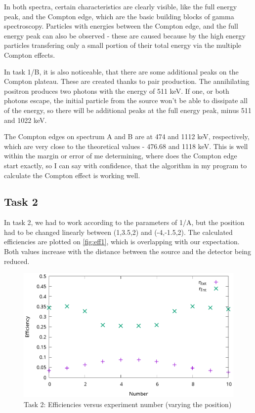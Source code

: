 \documentclass[a4paper,12pt]{article}
\begin{document}
In both spectra, certain characteristics are clearly visible, like the full energy peak, and the Compton edge, which are the basic building blocks of gamma spectroscopy. Particles with  energies between the Compton edge, and the full energy peak can also be observed - these are caused because by the high energy particles transfering only a small portion of their total energy via the multiple Compton effects.

In task 1/B, it is also noticeable, that there are some additional peaks on the Compton plateau. These are created thanks to pair production. The annihilating positron produces two photons with the energy of 511 keV. If one, or both photons escape, the initial particle from the source won't be able to dissipate all of the energy, so there will be additional peaks at the full energy peak, minus 511 and 1022 keV.

The Compton edges on spectrum A and B are at 474 and 1112 keV, respectively, which are very close to the theoretical values - 476.68 and 1118 keV. This is well within the margin or error of me determining, where does the Compton edge start exactly, so I can say with confidence, that the algorithm in my program to calculate the Compton effect is working well.

\subsection{Task 2}
In task 2, we had to work according to the parameters of 1/A, but the position had to be changed linearly between (1,3.5,2) and (-4,-1.5,2). The calculated efficiencies are plotted on \autoref{fig:eff1}, which is overlapping with our expectation. Both values increase with the distance between the source and the detector being reduced.
\begin{figure}[h!]
\centering
\includegraphics[width=\textwidth]{./2.eps}
\caption{Task 2: Efficiencies versus experiment number (varying the position)}
\label{fig:eff1}
\end{figure}
\end{document}
